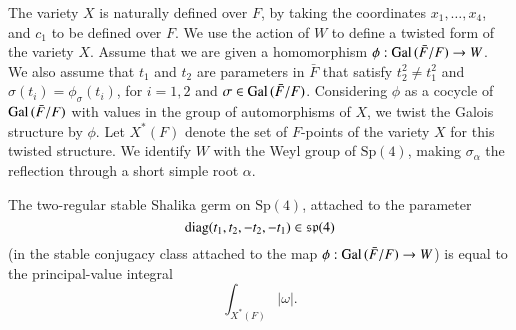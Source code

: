 \documentclass{amsart}
\newcommand\Gal{\hbox{Gal\,}}
\newcommand\diag{\hbox{diag}}
\newcommand\fsp{{\mathfrak s\mathfrak p}}
\newcommand\bF{{\bar F}}
\newenvironment{cthm}[1]
  {\renewcommand\thethm{\sc #1}\thm}
  {\endthm}
\begin{document}
The variety $X$ 
is naturally defined over $F$, by taking the coordinates
$x_1,\ldots,x_4$, and $c_1$ to be defined over $F$.  
We use the action of $W$ to define a twisted form of the variety $X$.
Assume that we are given
a homomorphism $\phi:\Gal(\bF/F)\to W$.  We also assume that
$t_1$ and $t_2$ are parameters in $\bF$ that satisfy
$t_2^2\ne t_1^2$ and
$\sigma(t_i) = \phi_\sigma(t_i)$, for $i=1,2$ and $\sigma\in \Gal(\bF/F)$.
Considering $\phi$ as a cocycle of $\Gal(\bF/F)$ with values in
the group of automorphisms of $X$, we twist
the Galois structure by $\phi$.
Let
$X^*(F)$ denote the set of $F$-points of the variety $X$ for this
twisted structure.
We identify $W$ with the Weyl group of $\text{Sp}(4)$, making $\sigma_\alpha$ the
reflection through a short simple root $\alpha$.
\bigskip

\noindent
\begin{cthm}{Lemma 3.1}
The two-regular stable Shalika germ on
$\text{Sp}(4)$, attached to the parameter
$$\diag(t_1,t_2,-t_2,-t_1) \in \fsp(4)$$ (in the stable conjugacy class
attached to the map $\phi:\Gal(\bF/F)\to W$) is equal to the
principal-value integral
$$\int_{X^*(F)} |\omega|.$$
\end{cthm}
\end{document}

